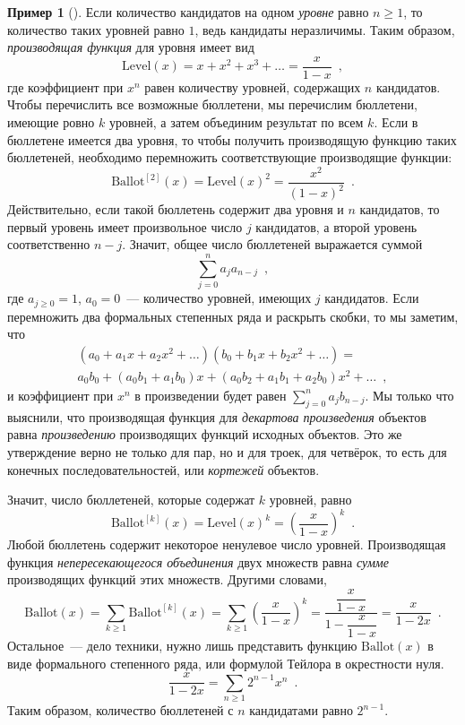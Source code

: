 \documentclass[a5paper]{article}
\theoremstyle{definition}
\newtheorem{example}{Пример}
\begin{document}
\begin{example}[{\cite[Example 10, p.36]{species}}]
Если количество кандидатов на одном \textit{уровне} равно \( n \geq 1 \), то 
количество таких уровней равно \( 1 \), ведь кандидаты неразличимы. Таким 
образом, \textit{производящая функция} для уровня имеет вид
\[
	\mathrm{Level}(x) = x + x^2 + x^3 + \ldots = \dfrac{x}{1-x} \enspace ,
\]
где коэффициент при \( x^n \)  равен количеству уровней, содержащих \( n \) 
кандидатов. Чтобы перечислить все возможные бюллетени, мы перечислим бюллетени, 
имеющие ровно \( k \) уровней, а затем объединим результат по всем \( k \). 
Если в бюллетене имеется два уровня, то чтобы получить производящую функцию 
таких бюллетеней, необходимо перемножить соответствующие производящие функции:
\[
	\mathrm{Ballot}^{[2]} (x) = \mathrm{Level}(x)^2 = \dfrac{x^2}{(1 - x)^2} 
	\enspace .
\]
Действительно, если такой бюллетень содержит два уровня и \( n \) кандидатов, 
то первый уровень имеет произвольное число \( j \) кандидатов, а второй уровень 
соответственно \( n-j \). Значит, общее число бюллетеней выражается суммой
\[
	\sum_{j=0}^{n} a_j a_{n-j} \enspace ,
\]
где \( a_{j \geq 0} = 1 \), \( a_0 = 0 \)~--- количество уровней, имеющих \( j 
\) кандидатов. Если перемножить два формальных степенных ряда и раскрыть 
скобки, то мы заметим, что
\begin{multline*}
	\left(a_0 + a_1 x + a_2 x^2 + \ldots
    \right)
    (b_0 + b_1 x + b_2 x^2 + \ldots) =\\
     a_0 b_0 
	+ (a_0 b_1 + a_1 b_0) x + (a_0 b_2 + a_1 b_1 + a_2 b_0) x^2 + \ldots
	\enspace ,
\end{multline*}
и коэффициент при \( x^n \) в произведении будет равен \( \sum_{j=0}^{n} a_j 
b_{n-j} \). Мы только что выяснили, что производящая функция для 
\textit{декартова произведения} объектов равна \textit{произведению} 
производящих функций исходных объектов. Это же утверждение верно не только для 
пар, но и для троек, для четвёрок, то есть для конечных последовательностей, 
или \textit{кортежей}
объектов.

Значит, число бюллетеней, которые содержат \( k \) уровней, равно
\[
	\mathrm{Ballot}^{[k]}(x) = \mathrm{Level}(x)^{k} = 
	\left(\dfrac{x}{1-x}\right)^k \enspace .
\]
Любой бюллетень содержит некоторое ненулевое число уровней. Производящая 
функция \textit{непересекающегося объединения} двух множеств равна 
\textit{сумме} производящих функций этих множеств. Другими словами,
\[
	\mathrm{Ballot}(x) = \sum_{k \geq 1} \mathrm{Ballot}^{[k]}(x) = \sum_{k 
	\geq 1} \left(\dfrac{x}{1-x}\right)^k = \dfrac{\dfrac{x}{1-x}}{1 - 
	\dfrac{x}{1 - x}} 
	= \dfrac{x}{1 - 2x}
	\enspace .
\]
Остальное~--- дело техники, нужно лишь представить функцию \( 
\mathrm{Ballot}(x) \) в виде формального степенного ряда, или формулой Тейлора 
в окрестности нуля.
\[
	\dfrac{x}{1 - 2x} = \sum_{n \geq 1} 2^{n-1} 
	x^n \enspace .
\]
Таким образом, количество бюллетеней с \( n \) кандидатами равно \( 2^{n-1} \).
\end{example}
\end{document}
